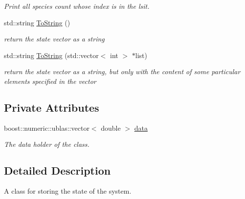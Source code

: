 \begin{CompactItemize}
\begin{CompactList}\small\item\em Print all species count whose index is in the lsit. \item\end{CompactList}\item 
\hypertarget{class_stoch_vector_346152804c3fede10ce814b8c72ddac4}{
std::string \hyperlink{class_stoch_vector_346152804c3fede10ce814b8c72ddac4}{ToString} ()}
\label{class_stoch_vector_346152804c3fede10ce814b8c72ddac4}

\begin{CompactList}\small\item\em return the state vector as a string \item\end{CompactList}\item 
\hypertarget{class_stoch_vector_73c3cf45ee6068df654df2846495aa3a}{
std::string \hyperlink{class_stoch_vector_73c3cf45ee6068df654df2846495aa3a}{ToString} (std::vector$<$ int $>$ $\ast$list)}
\label{class_stoch_vector_73c3cf45ee6068df654df2846495aa3a}

\begin{CompactList}\small\item\em return the state vector as a string, but only with the content of some particular elements specified in the vector \item\end{CompactList}\end{CompactItemize}
\subsection*{Private Attributes}
\begin{CompactItemize}
\item 
boost::numeric::ublas::vector$<$ double $>$ \hyperlink{class_stoch_vector_b5a664be6ff1c1be939fba2483d4503b}{data}
\begin{CompactList}\small\item\em The data holder of the class. \item\end{CompactList}\end{CompactItemize}


\subsection{Detailed Description}
A class for storing the state of the system. 



